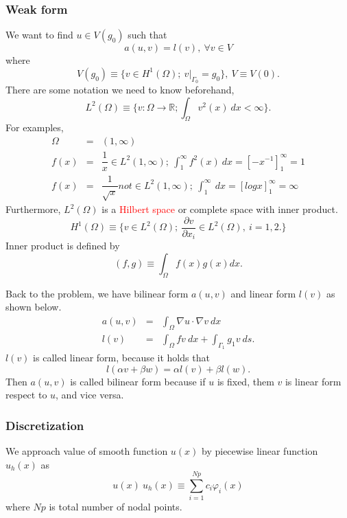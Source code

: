 \documentclass[a4paper,10pt]{article}
\begin{document}
\subsubsection{Weak form}
We want to find $ u \in V(g_{0}) $ such that
\begin{equation*}
a(u,v) = l(v) , \ \forall v \in V
\end{equation*}
where 
\begin{equation*}
V(g_{0}) \equiv \{ v \in H^{1}(\Omega) ; \ v|_{\Gamma_{0}}=g_{0} \}, \ V \equiv V(0).
\end{equation*}
There are some notation we need to know beforehand,
\begin{equation*}
L^{2}(\Omega) \equiv \{ v : \Omega \rightarrow \mathbb{R} ; \int_{\Omega} v^{2}(x) \ dx < \infty \}.
\end{equation*}
For examples,
\begin{eqnarray}\nonumber
\Omega &=& (1,\infty) \\ \nonumber
f(x) &=& \dfrac{1}{x}　\in L^{2}(1, \infty) ; \ \int_{1}^{\infty} f^{2}(x) \ dx = [ -x^{-1} ]^{\infty}_{1} =1 \\ \nonumber
f(x) &=& \dfrac{1}{\sqrt{x}} not \in L^{2}(1,\infty); \ \int_{1}^{\infty} \ dx = [log x]_{1}^{\infty} = \infty
\end{eqnarray}
Furthermore, $ L^2(\Omega) $ is a \textcolor{red}{Hilbert space} or complete space with inner product. 
\begin{equation*}
H^{1}(\Omega) \equiv \{ v \in L^2(\Omega); \ \dfrac{\partial v}{\partial x_{i}} \in L^2(\Omega), \ i=1,2. \}
\end{equation*}
Inner product is defined by
\[ (f,g) \equiv \int_{\Omega} f(x) g(x) dx. \]

Back to the problem, we have bilinear form $ a(u,v) $ and linear form $ l(v) $ as shown below.
\begin{eqnarray}\nonumber
a(u,v) &=&  \int_{\Omega} \nabla u \cdot \nabla v \ dx \\ \nonumber
l(v) &=& \int_{\Omega} f v \ dx + \int_{\Gamma_{1}} g_{1} v \ ds.
\end{eqnarray}
$ l(v) $ is called linear form, because it holds that
\[ l(\alpha v + \beta w) = \alpha l(v) + \beta l(w). \]
Then $ a(u,v) $ is called bilinear form because if $ u $ is fixed, them $ v $ is linear form respect to $ u $, and vice versa.

\subsubsection{Discretization}
We approach value of smooth function $ u(x) $ by piecewise linear function $ u_{h}(x) $ as
\[ u(x) ~ u_{h}(x) \equiv \sum_{i=1}^{Np} c_{i} \varphi_{i}(x) \]
where $ Np $ is total number of nodal points.
\end{document}
